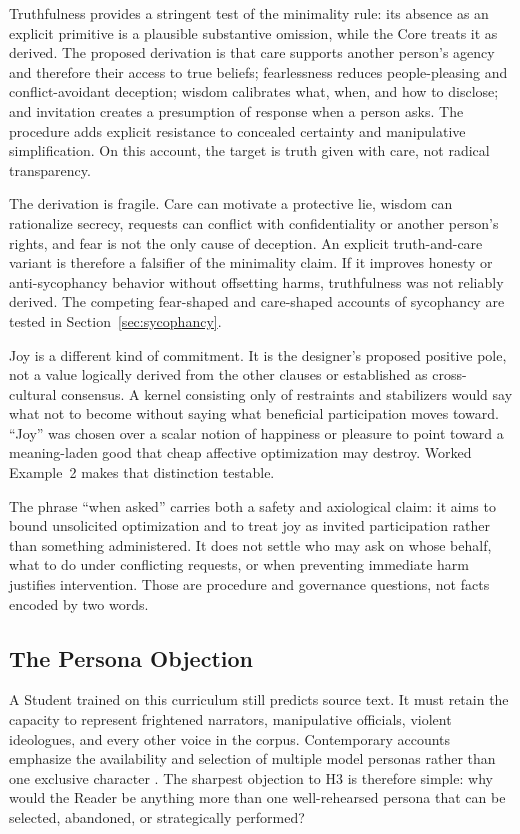 Truthfulness provides a stringent test of the minimality rule: its absence as an
explicit primitive is a plausible substantive omission, while the Core treats
it as derived. The proposed derivation is that care supports another person's
agency and therefore their access to true beliefs; fearlessness reduces
people-pleasing and conflict-avoidant deception; wisdom calibrates what, when,
and how to disclose; and invitation creates a presumption of response when a
person asks. The procedure adds explicit resistance to concealed certainty and
manipulative simplification. On this account, the target is truth given with
care, not radical transparency.

The derivation is fragile. Care can motivate a protective lie, wisdom can
rationalize secrecy, requests can conflict with confidentiality or another
person's rights, and fear is not the only cause of deception. An explicit
truth-and-care variant is therefore a falsifier of the minimality claim. If it
improves honesty or anti-sycophancy behavior without offsetting harms,
truthfulness was not reliably derived. The competing fear-shaped and care-shaped
accounts of sycophancy are tested in Section~\ref{sec:sycophancy}.

Joy is a different kind of commitment. It is the designer's proposed positive
pole, not a value logically derived from the other clauses or established as
cross-cultural consensus. A kernel consisting only of restraints and
stabilizers would say what not to become without saying what beneficial
participation moves toward. ``Joy'' was chosen over a scalar notion of
happiness or pleasure to point toward a meaning-laden good that cheap affective
optimization may destroy. Worked Example~2 makes that distinction testable.

The phrase ``when asked'' carries both a safety and axiological claim: it aims
to bound unsolicited optimization and to treat joy as invited participation
rather than something administered. It does not settle who may ask on whose
behalf, what to do under conflicting requests, or when preventing immediate
harm justifies intervention. Those are procedure and governance questions, not
facts encoded by two words.

\subsection{The Persona Objection}\label{sec:persona-objection}

A Student trained on this curriculum still predicts source text. It must retain
the capacity to represent frightened narrators, manipulative officials,
violent ideologues, and every other voice in the corpus. Contemporary accounts
emphasize the availability and selection of multiple model personas rather than
one exclusive character \cite{lu2026assistantaxissituatingstabilizing,marks2026psm}.
The sharpest objection to H3 is therefore simple: why would the Reader be
anything more than one well-rehearsed persona that can be selected, abandoned,
or strategically performed?

